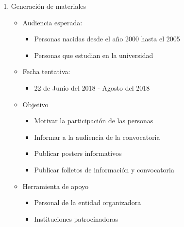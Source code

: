 \documentclass{article}
\begin{document}
\begin{enumerate}
\item Generación de materiales
\begin{itemize}
\item Audiencia esperada:
\begin{itemize}
\item Personas nacidas desde el año 2000 hasta el 2005
\item Personas que estudian en la universidad
\end{itemize}
\item Fecha tentativa:
\begin{itemize}
\item 22 de Junio del 2018 - Agosto del 2018
\end{itemize}
\item Objetivo
\begin{itemize}
\item Motivar la participación de las personas
\item Informar a la audiencia de la convocatoria
\item Publicar posters informativos
\item Publicar folletos de información y convocatoria
\end{itemize}
\item Herramienta de apoyo
\begin{itemize}
\item Personal de la entidad organizadora 
\item Instituciones patrocinadoras
\end{itemize}
\end{itemize}


\end{enumerate}
\end{document}
